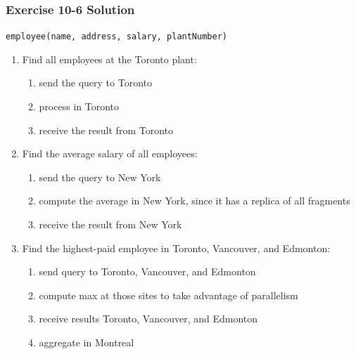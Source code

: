 \begin{frame}
\frametitle{Exercise 10-6 Solution}

\begin{center}
  \texttt{employee(name, address, salary, plantNumber)}
\end{center}

\begin{enumerate}
  \item Find all employees at the Toronto plant:
    \begin{enumerate}
      \item send the query to Toronto
      \item process in Toronto
      \item receive the result from Toronto
    \end{enumerate}
  \item Find the average salary of all employees:
    \begin{enumerate}
      \item send the query to New York
      \item compute the average in New York, since it has a replica of all fragments
      \item receive the result from New York
    \end{enumerate}
  \item Find the highest-paid employee in Toronto, Vancouver, and Edmonton:
    \begin{enumerate}
      \item send query to Toronto, Vancouver, and Edmonton
      \item compute max at those sites to take advantage of parallelism
      \item receive results Toronto, Vancouver, and Edmonton
      \item aggregate in Montreal
    \end{enumerate}
\end{enumerate}

\end{frame}


